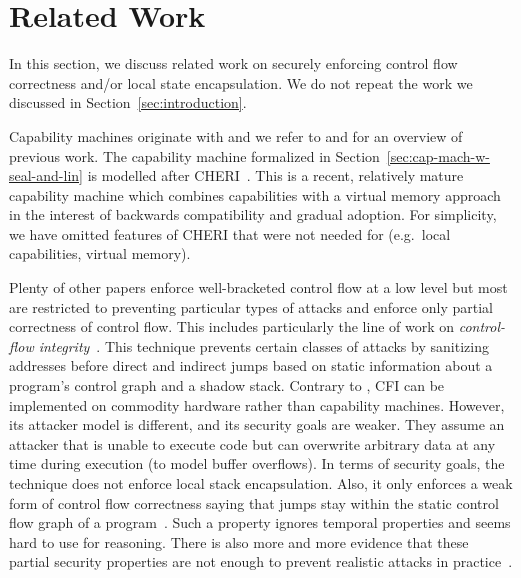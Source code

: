\documentclass[acmsmall,review,showframe]{acmart}\settopmatter{printfolios=true,printccs=false,printacmref=false}
\begin{document}
\section{Related Work}


In this section, we discuss related work on securely enforcing control flow correctness and/or local state encapsulation.
We do not repeat the work we discussed in Section~\ref{sec:introduction}.

Capability machines originate with \citet{dennis_programming_1966} and we refer to \citet{levy_capability-based_1984} and \citet{watson_cheri:_2015} for an overview of previous work.
The capability machine formalized in Section~\ref{sec:cap-mach-w-seal-and-lin} is modelled after CHERI~\citep{watson_cheri:_2015,woodruff_cheri_2014}.
This is a recent, relatively mature capability machine which combines capabilities with a virtual memory approach in the interest of backwards compatibility and gradual adoption.
For simplicity, we have omitted features of CHERI that were not needed for \stktokens{} (e.g.\ local capabilities, virtual memory).

Plenty of other papers enforce well-bracketed control flow at a low level but most are restricted to preventing particular types of attacks and enforce only partial correctness of control flow.
This includes particularly the line of work on \emph{control-flow integrity}~\citep{abadi_control-flow_2005}.
This technique prevents certain classes of attacks by sanitizing addresses before direct and indirect jumps based on static information about a program's control graph and a shadow stack.
Contrary to \stktokens{}, CFI can be implemented on commodity hardware rather than capability machines.
However, its attacker model is different, and its security goals are weaker.
They assume an attacker that is unable to execute code but can overwrite arbitrary data at any time during execution (to model buffer overflows).
In terms of security goals, the technique does not enforce local stack encapsulation.
Also, it only enforces a weak form of control flow correctness saying that jumps stay within the static control flow graph of a program~\cite{Abadi2005Theory}.
Such a property ignores temporal properties and seems hard to use for reasoning.
There is also more and more evidence that these partial security properties are not enough to prevent realistic attacks in practice~\citep{Evans:2015:CJW:2810103.2813646,Carlini2015ControlFlowBending}.
\end{document}
